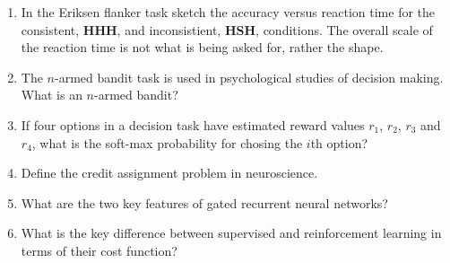 \documentclass{article}
\newif\ifanswer
\begin{document}
\begin{enumerate}
\item In the Eriksen flanker task sketch the accuracy versus
reaction time for the consistent, \textbf{HHH}, and inconsistient,
\textbf{HSH}, conditions. The overall scale of the reaction time is
not what is being asked for, rather the shape.

\ifanswer \textbf{Answer}:\\
In both cases the line starts at 0.5 but in the consistient case it
rises quickly to one, in the inconsistient case it falls below 0.5
before rising more slowly to one. [1 mark for starting at 0.5 and rising to 1, the other for the dip in inconsistient].
\fi

\item The $n$-armed bandit task is used in psychological studies of decision making. What is an $n$-armed bandit?

  \ifanswer \textbf{Answer}:\\
  In an $n$-armed bandit the participant has to chose between $n$ options, typically $n$ buttons, each with a different probability of reward.
  \fi

\item If four options in a decision task have estimated reward values $r_1$, $r_2$, $r_3$ and $r_4$, what is the soft-max probability for chosing the $i$th option?

  \ifanswer \textbf{Answer}:\\
  \begin{equation}
    p_i=\frac{e^{\beta r_i}}{\sum_j e^{\beta r_j}}
  \end{equation}
  for some $\beta$, a parameter determining the exploration to exploitation balance.
  \fi


\item Define the credit assignment problem in neuroscience.

  \ifanswer \textbf{Answer}: The credit assignment is the problem of deciding how to change parameters in the brain (typically synaptic weights) to best improve behaviour (e.g. a desired motor output).
  \fi
  
\item What are the two key features of gated recurrent neural networks?

  \ifanswer \textbf{Answer}: Gated RNNs have two defining features, the memory cell and the gating units.\\
  \fi
  
\item What is the key difference between supervised and reinforcement learning in terms of their cost function?


\end{enumerate}
\end{document}
